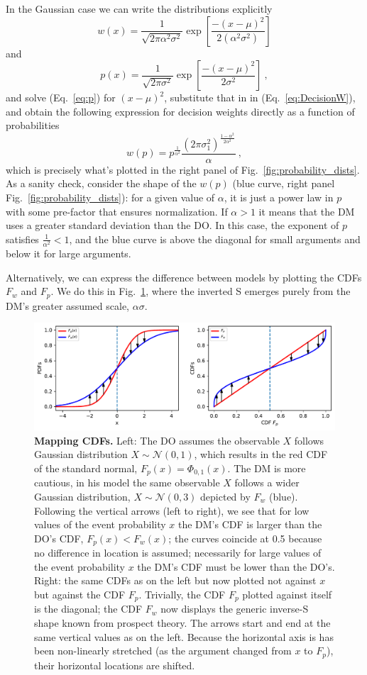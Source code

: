 \documentclass[a4paper, 12pt]{article}
\newcommand{\elabel}[1]{\label{eq:#1}}
\newcommand{\eref}[1]{(Eq.~\ref{eq:#1})}
\newcommand{\flabel}[1]{\label{fig:#1}}
\newcommand{\fref}[1]{Fig.~\ref{fig:#1}}
\newcommand{\be}{\begin{equation}}
\newcommand{\ee}{\end{equation}}
\newcommand{\ND}{\mathcal{N}} %
\begin{document}
In the Gaussian case we can write the distributions explicitly
\be \elabel{DecisionW}
	w(x)=\frac{1}{\sqrt{2\pi \alpha^2 \sigma^2}}\exp\left[\frac{-(x -\mu )^2}{2 (\alpha^2 \sigma^2)}\right]
\ee
and
\be
	p(x)=\frac{1}{\sqrt{2\pi \sigma^2}}\exp\left[\frac{-(x -\mu )^2}{2 \sigma^2}\right] ~,
\elabel{p}
\ee
% 
and solve \eref{p} for $(x -\mu)^2$, substitute that in in \eref{DecisionW}, and obtain the following expression for decision weights directly as a function of probabilities
\be
w(p)= p^{\frac{1}{\alpha^2}} \frac{\left(2\pi\sigma_1^2\right)^{\frac{1-\alpha^2}{2\alpha^2}}}{\alpha} ~,
\elabel{w_of_p}
\ee
which is precisely what's plotted in the right panel of \fref{probability_dists}. As a sanity check, consider the shape of the $w(p)$ (blue curve, right panel \fref{probability_dists}): for a given value of $\alpha$, it is just a power law in $p$ with some pre-factor that ensures normalization. If $\alpha>1$ it means that the DM uses a greater standard deviation than the DO. In this case, the exponent of $p$ satisfies $\frac{1}{\alpha^2}<1$, and the blue curve is above the diagonal for small arguments and below it for large arguments.

Alternatively, we can express the difference between models by plotting the CDFs $F_w$ and $F_p$. We do this in \fref{TwoCDFs}, where the inverted S emerges purely from the DM's greater assumed scale, $\alpha \sigma$.

\begin{figure}[!htb]
\centering
\includegraphics[width=\textwidth]{./figs/GaussianFvsXtoWvsP.pdf}
\caption{{\bf Mapping CDFs.} 
Left: The DO assumes the observable $X$ follows Gaussian distribution $X \sim \ND(0,1)$, which results in the red CDF of the standard normal, $F_p(x) = \Phi_{0,1}(x)$. The DM is more cautious, in his model the same observable $X$ follows a wider Gaussian distribution, $X \sim \ND(0,3)$ depicted by $F_w$ (blue). 
% 
Following the vertical arrows (left to right), we see that for low values of the event probability $x$ the DM's CDF is larger than the DO's CDF, $F_p(x) < F_w(x)$; the curves coincide at 0.5 because no difference in location is assumed; necessarily for large values of the event probability $x$ the DM's CDF must be lower than the DO's.
Right: the same CDFs as on the left but now plotted not against $x$ but against the CDF $F_p$. Trivially, the CDF $F_p$ plotted against itself is the diagonal; the CDF $F_w$ now displays the generic inverse-S shape known from prospect theory. The arrows start and end at the same vertical values as on the left. Because the horizontal axis is has been non-linearly stretched (as the argument changed from $x$ to $F_p$), their horizontal locations are shifted.
}
\flabel{TwoCDFs}
\end{figure}
\end{document}
